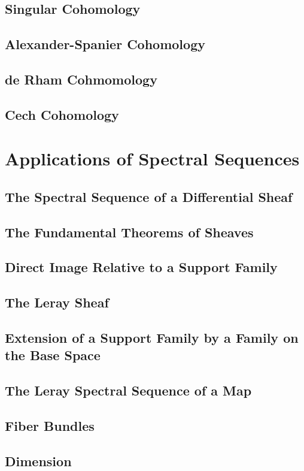 \subsection{Singular Cohomology}
\subsection{Alexander-Spanier Cohomology}
\subsection{de Rham Cohmomology}
\subsection{Cech Cohomology}

\section{Applications of Spectral Sequences}
\subsection{The Spectral Sequence of a Differential Sheaf}
\subsection{The Fundamental Theorems of Sheaves}
\subsection{Direct Image Relative to a Support Family}
\subsection{The Leray Sheaf}
\subsection{Extension of a Support Family by a Family on the Base Space}
\subsection{The Leray Spectral Sequence of a Map}
\subsection{Fiber Bundles}
\subsection{Dimension}

